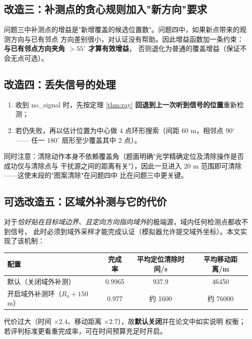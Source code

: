 \subsection{改造三：补测点的贪心规则加入"新方向"要求}

问题三中补测点的增益是"新增覆盖的候选位置数"。问题四中，如果新点带来的观测方向与已有邻点
方向差别很小，对认证没有帮助。因此增益函数加一条约束：\textbf{与已有邻点方向夹角 $>55^{\circ}$ 才算有效增益}，
否则退化为普通的覆盖增益（保证不会无点可选）。

\subsection{改造四：丢失信号的处理}

\begin{enumerate}[leftmargin=1.8em]
  \item 收到 no\_signal 时，先按定理 \ref{thm:ray} \textbf{回退到上一次听到信号的位置}重新检测；
  \item 若仍失败，再以估计位置为中心做 4 点环形搜索（间距 60 m，相邻点 90$^{\circ}$——
        任一 $180^{\circ}$ 扇形至少覆盖其中 2 点）。
\end{enumerate}

同时注意：清除动作本身不依赖覆盖角（题面明确"光学精确定位及清除操作是否成功仅与清除点与
干扰源之间的距离有关"），因此一旦进入 20 m 范围即可清除——这使末段的"图案清除"在问题四中
比在问题三中更关键。

\subsection{可选改造五：区域外补测与它的代价}

对于\emph{恰好贴在目标域边界、且定向方向指向域外}的极端源，域内任何检测点都收不到信号，
此时必须到域外采样才能完成认证（模拟器允许提交域外坐标）。本文实现了该机制：

\begin{center}
\begin{tabular}{lccc}
\toprule
配置 & 完成率 & 平均定位清除时间/s & 平均移动距离/m \\ \midrule
默认（关闭域外补测） & 0.9965 & 937.9 & 46450 \\
开启域外补测环（$R_a+150$ m） & 0.977 & 约 1600 & 约 76000 \\
\bottomrule
\end{tabular}
\end{center}

代价过大（时间 $\times2.4$、移动距离 $\times2.7$），故\textbf{默认关闭}并在论文中如实说明
权衡；若评判标准更看重完成率，可在时间预算充足时开启。

